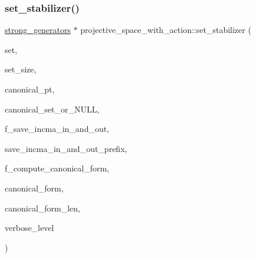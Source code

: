 \subsubsection{\texorpdfstring{set\+\_\+stabilizer()}{set\_stabilizer()}}
{\footnotesize\ttfamily \mbox{\hyperlink{classstrong__generators}{strong\+\_\+generators}} $\ast$ projective\+\_\+space\+\_\+with\+\_\+action\+::set\+\_\+stabilizer (\begin{DoxyParamCaption}\item[{\mbox{\hyperlink{galois_8h_a09fddde158a3a20bd2dcadb609de11dc}{I\+NT}} $\ast$}]{set,  }\item[{\mbox{\hyperlink{galois_8h_a09fddde158a3a20bd2dcadb609de11dc}{I\+NT}}}]{set\+\_\+size,  }\item[{\mbox{\hyperlink{galois_8h_a09fddde158a3a20bd2dcadb609de11dc}{I\+NT}} \&}]{canonical\+\_\+pt,  }\item[{\mbox{\hyperlink{galois_8h_a09fddde158a3a20bd2dcadb609de11dc}{I\+NT}} $\ast$}]{canonical\+\_\+set\+\_\+or\+\_\+\+N\+U\+LL,  }\item[{\mbox{\hyperlink{galois_8h_a09fddde158a3a20bd2dcadb609de11dc}{I\+NT}}}]{f\+\_\+save\+\_\+incma\+\_\+in\+\_\+and\+\_\+out,  }\item[{const \mbox{\hyperlink{galois_8h_ab6cc7b4aeb6ea31aba2b3fbfc83ff5e6}{B\+Y\+TE}} $\ast$}]{save\+\_\+incma\+\_\+in\+\_\+and\+\_\+out\+\_\+prefix,  }\item[{\mbox{\hyperlink{galois_8h_a09fddde158a3a20bd2dcadb609de11dc}{I\+NT}}}]{f\+\_\+compute\+\_\+canonical\+\_\+form,  }\item[{\mbox{\hyperlink{galois_8h_a122c4acf389c050379f00341fdcd5812}{U\+B\+Y\+TE}} $\ast$\&}]{canonical\+\_\+form,  }\item[{\mbox{\hyperlink{galois_8h_a09fddde158a3a20bd2dcadb609de11dc}{I\+NT}} \&}]{canonical\+\_\+form\+\_\+len,  }\item[{\mbox{\hyperlink{galois_8h_a09fddde158a3a20bd2dcadb609de11dc}{I\+NT}}}]{verbose\+\_\+level }\end{DoxyParamCaption})}

\mbox{\label{classprojective__space__with__action_afe03a07856b7e7f99c806fcd00c75efe}} 
